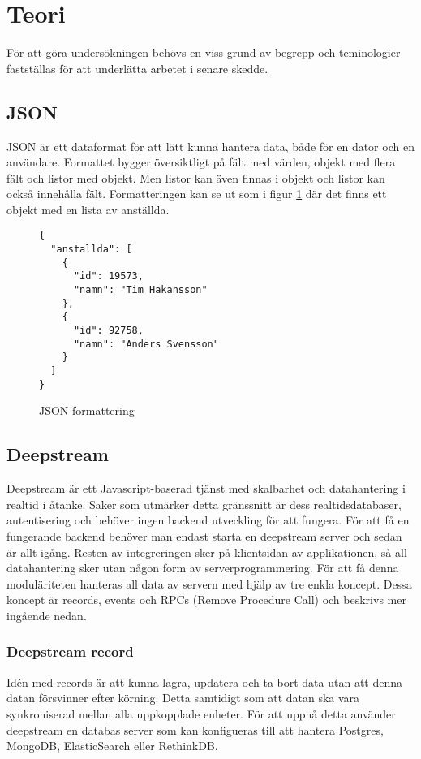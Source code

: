 \section{Teori}

\label{sec:tim-theory}
För att göra undersökningen behövs en viss grund av begrepp och teminologier fastställas för att underlätta arbetet i senare skedde.

\subsection{JSON}
JSON\cite{json} är ett dataformat för att lätt kunna hantera data, både för en dator och en användare. Formattet bygger översiktligt på fält med värden, objekt med flera fält och listor med objekt. Men listor kan även finnas i objekt och listor kan också innehålla fält. Formatteringen kan se ut som i figur \ref{fig:jsonformat} där det finns ett objekt med en lista av anställda.

\lstset{language=Java}
\begin{figure}[h]
  \center
  \begin{minipage}[c]{5cm}
    \begin{lstlisting}
{
  "anstallda": [   
    {
      "id": 19573,
      "namn": "Tim Hakansson"
    },
    {
      "id": 92758,
      "namn": "Anders Svensson"
    }
  ]
}
    \end{lstlisting}
  \end{minipage}
  \caption{JSON formattering}
  \label{fig:jsonformat}
\end{figure}

\subsection{Deepstream}
\label{subsec:tim-deepstream}
Deepstream är ett Javascript-baserad tjänst med skalbarhet och datahantering i realtid i åtanke. Saker som utmärker detta gränssnitt är dess realtidsdatabaser, autentisering och behöver ingen backend utveckling för att fungera. För att få en fungerande backend behöver man endast starta en deepstream server och sedan är allt igång. Resten av integreringen sker på klientsidan av applikationen, så all datahantering sker utan någon form av serverprogrammering. För att få denna moduläriteten hanteras all data av servern med hjälp av tre enkla koncept. Dessa koncept är records, events och RPCs (Remove Procedure Call) och beskrivs mer ingående nedan. 

\subsubsection{Deepstream record}
Idén med records är att kunna lagra, updatera och ta bort data utan att denna datan försvinner efter körning. Detta samtidigt som att datan ska vara synkroniserad mellan alla uppkopplade enheter. För att uppnå detta använder deepstream en databas server som kan konfigueras till att hantera Postgres, MongoDB, ElasticSearch eller RethinkDB. 


